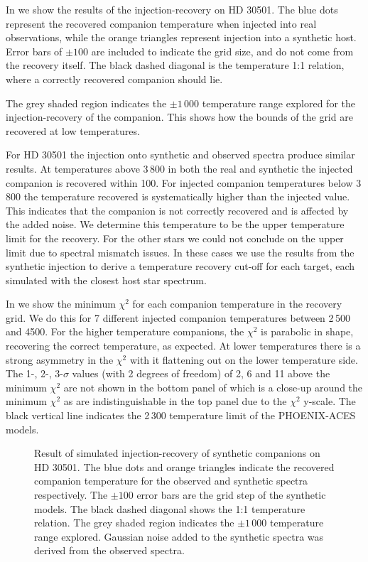 In  we show the results of the injection-recovery on {HD 30501}. The blue dots represent the recovered companion temperature when injected into real observations, while the orange triangles represent injection into a synthetic host. Error bars of \(\pm100\)\K{} are included to indicate the grid size, and do not come from the recovery itself. The black dashed diagonal is the temperature 1:1 relation, where a correctly recovered companion should lie.

The grey shaded region indicates the \(\pm1\,000\)\K{} temperature range explored for the injection-recovery of the companion. This shows how the bounds of the grid are recovered at low temperatures.

For {HD 30501} the injection onto synthetic and observed spectra produce similar results. At temperatures above 3\,800\K{} in both the real and synthetic the injected companion is recovered within 100\K{}. For injected companion temperatures below 3\,800\K{} the temperature recovered is systematically higher than the injected value. This indicates that the companion is not correctly recovered and is affected by the added noise. We determine this temperature to be the upper temperature limit for the recovery. For the other stars we could not conclude on the upper limit due to spectral mismatch issues. In these cases we use the results from the synthetic injection to derive a temperature recovery cut-off for each target, each simulated with the closest host star spectrum.

In  we show the minimum \(\chi^2\) for each companion temperature in the recovery grid. We do this for 7 different injected companion temperatures between 2\,500 and 4500\K{}. For the higher temperature companions, the \(\chi^2\) is parabolic in shape, recovering the correct temperature, as expected. At lower temperatures there is a strong asymmetry in the \(\chi^2\) with it flattening out on the lower temperature side.
The 1-, 2-, 3-\(\sigma\) values (with 2 degrees of freedom) of 2, 6 and 11 above the minimum \(\chi^2\) are not shown in the bottom panel of  which is a close-up around the minimum \(\chi^2\) as are indistinguishable in the top panel due to the \(\chi^2\) y-scale. The black vertical line indicates the 2\,300\K{} temperature limit of the {PHOENIX-ACES} models.

\begin{figure}
    \centering
    \caption{Result of simulated injection-recovery of synthetic companions on {HD 30501}. The blue dots and orange triangles indicate the recovered companion temperature for the observed and synthetic spectra respectively. The \(\pm100\)\K{} error bars are the grid step of the synthetic models. The black dashed diagonal shows the 1:1 temperature relation. The grey shaded region indicates the \(\pm1\,000\)\K{} temperature range explored. Gaussian noise added to the synthetic spectra was derived from the observed spectra.}
    \label{fig:injection-recovery}
\end{figure}


